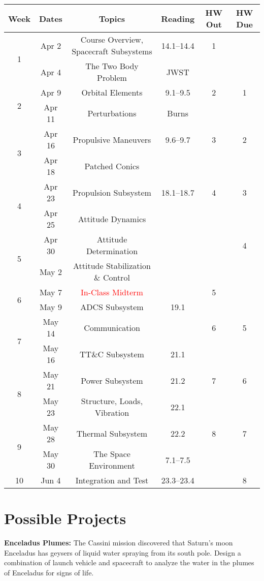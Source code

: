 \documentclass[11pt,letterpaper]{article}
\begin{document}
\begin{tabular}{c|c|c|c|c|c}
	Week & Dates & Topics & Reading & HW Out & HW Due \\
	\hline
	\multirow{2}{*}{1} & Apr 2 & Course Overview, Spacecraft Subsystems & 14.1--14.4 & 1 & \\
	 & Apr 4 & The Two Body Problem & JWST & & \\
	\hline
	\multirow{2}{*}{2} & Apr 9 & Orbital Elements & 9.1--9.5 & 2 & 1 \\
	 & Apr 11 & Perturbations & Burns & & \\
	\hline
	\multirow{2}{*}{3}  & Apr 16 & Propulsive Maneuvers & 9.6--9.7 & 3 & 2\\
	 & Apr 18 & Patched Conics & & & \\
	\hline
	\multirow{2}{*}{4}  & Apr 23 & Propulsion Subsystem & 18.1--18.7 & 4 & 3\\
	 & Apr 25 & Attitude Dynamics & & & \\
	\hline
	\multirow{2}{*}{5}  & Apr 30 & Attitude Determination & & & 4\\
	 & May 2 & Attitude Stabilization \& Control & & & \\
	\hline
	\multirow{2}{*}{6}  & May 7 & \textcolor{red}{In-Class Midterm} &  & 5 & \\
	 & May 9 & ADCS Subsystem & 19.1 & & \\
	\hline
	\multirow{2}{*}{7}  & May 14 & Communication &  & 6 & 5\\
	 & May 16 & TT\&C Subsystem & 21.1 & & \\
	\hline
	\multirow{2}{*}{8}  & May 21 & Power Subsystem & 21.2 & 7 & 6\\
	 & May 23 & Structure, Loads, Vibration & 22.1 & & \\
	\hline
	\multirow{2}{*}{9}  & May 28 & Thermal Subsystem & 22.2 & 8 & 7\\
	 & May 30 & The Space Environment & 7.1--7.5 & & \\
	\hline
	10 & Jun 4 & Integration and Test & 23.3--23.4 & & 8\\
\end{tabular}

\section*{Possible Projects}

\textbf{Enceladus Plumes:} The Cassini mission discovered that Saturn's moon Enceladus has geysers of liquid water spraying from its south pole. Design a combination of launch vehicle and spacecraft to analyze the water in the plumes of Enceladus for signs of life.
\end{document}
